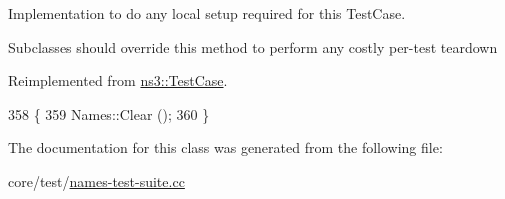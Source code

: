 Implementation to do any local setup required for this Test\+Case. 

Subclasses should override this method to perform any costly per-\/test teardown 

Reimplemented from \hyperlink{classns3_1_1TestCase_a8917f1604e28d312a8086f76291e3c46}{ns3\+::\+Test\+Case}.


\begin{DoxyCode}
358 \{
359   Names::Clear ();
360 \}
\end{DoxyCode}


The documentation for this class was generated from the following file\+:\begin{DoxyCompactItemize}
\item 
core/test/\hyperlink{names-test-suite_8cc}{names-\/test-\/suite.\+cc}\end{DoxyCompactItemize}
